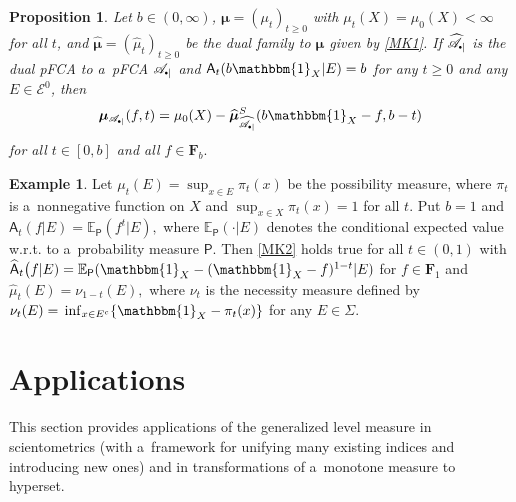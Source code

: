 \documentclass[preprint,11pt]{elsarticle}
\newtheorem{proposition}[tw]{Proposition}
\theoremstyle{definition}
\newtheorem{example}[tw]{Example}
\newcommand\bF{\mathbf{F}} %
\newcommand\bFb{\mathbf{F}_{b}} %
\newcommand\cE{{\mathcal E}}
\newcommand\sA{\mathsf{A}}
\newcommand\sbullet[1][.5]{\mathbin{\vcenter{\hbox{\scalebox{#1}{$\bullet$}}}}}
\newcommand\bpA{\mathscr {A}_{\sbullet|}}%
\newcommand\bpeA{\mathscr {A}_{\sbullet|\sbullet}}%
\newcommand{\bmu}{\boldsymbol{\mu}}
\newcommand\bmub[1][\bpeA]{\bmu_{#1}}
\renewcommand\ge{\geqslant}
\newcommand{\mI}[1]{\mathbbm{1}_{#1}}%
\newcommand{\tx}{\textstyle{}}
\begin{document}
\begin{proposition} Let $b\in(0,\infty)$, $\bmu=(\mu_t)_{t\ge 0}$ with $\mu_t(X)=\mu_0(X)<\infty$ for all $t$, and   $\widehat{\bmu}=(\widehat{\mu}_t)_{t\ge 0}$ be the dual family to $\bmu$ given by \eqref{MK1}.
If  $\widehat{\bpA}$ is the dual pFCA to a~pFCA $\bpA$  and $\sA_t(b\mI{X}|E)=b$ for any $t\ge 0$ and any $E\in \cE^0$, then
\begin{align}\label{MK2}
\bmub[\bpA](f,t)=\mu_0(X)-\widehat{\bmu}^{S}_{\widehat{\bpA}}(b\mI{X}-f,b-t)
\end{align}
for all $t\in [0,b]$ and all $f\in \bFb.$
\end{proposition}


\begin{example}
Let $\mu _t(E)=\tx{\sup_{x\in E}\pi_t(x)}$ be the possibility measure, where $\pi_t$ is a~nonnegative function on $X$ and $\tx{\sup_{x\in X}\pi_t(x)=1}$ for all $t.$  Put $b=1$ and $\sA_t(f|E)=\mathbb{E}_\mathsf{P}(f^{t}|E),$ where $\mathbb{E}_{\mathsf{P}}(\cdot|E)$ denotes the conditional expected value w.r.t. to a~probability measure $\mathsf{P}$.
Then \eqref{MK2} holds true for all $t\in (0,1)$ with $\widehat{\sA}_t\big(f|E)=\mathbb{E}_{\mathsf{P}}(\mI{X}-(\mI{X}-f)^{1-t}|E)$ for $f\in\bF_1$ and $\widehat{\mu}_t(E)=\nu_{1-t}(E),$ where $\nu_t$ is the necessity measure defined by $\nu_t(E)=
{\tx \inf_{x\in E^c}\{\mI{X}-\pi_t(x)\}}$ for any $E\in \Sigma.$
\end{example}

\section{Applications}\label{sec:4}

This section provides applications of the generalized level measure in scientometrics (with a~framework for unifying many existing indices and introducing new ones) and in transformations of a~monotone measure to hyperset.
\end{document}
